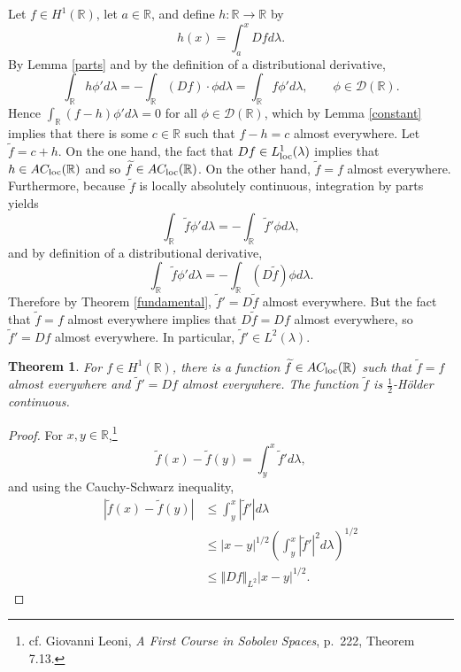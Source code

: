 \documentclass{article}
\newcommand{\Lloc}{L_{\ensuremath\mathrm{loc}}^1(\lambda)}
\newcommand{\ACloc}{AC_{\ensuremath\mathrm{loc}}(\mathbb{R})}
\newcommand{\norm}[1]{\left\Vert #1 \right\Vert}
\newtheorem{theorem}{Theorem}
\theoremstyle{definition}
\begin{document}
Let $f \in H^1(\mathbb{R})$, let $a \in \mathbb{R}$, and define $h:\mathbb{R} \to \mathbb{R}$ by
\[
h(x) = \int_a^x Df d\lambda.
\]
By Lemma \ref{parts} and by the definition of a distributional derivative,
\[
\int_\mathbb{R} h \phi' d\lambda = - \int_\mathbb{R} (Df) \cdot \phi d\lambda
=\int_\mathbb{R} f \phi' d\lambda,\qquad \phi \in \mathscr{D}(\mathbb{R}).
\]
Hence $\int_\mathbb{R} (f-h) \phi' d\lambda=0$ for all $\phi \in \mathscr{D}(\mathbb{R})$, which by Lemma
\ref{constant} implies that there is some $c \in \mathbb{R}$ such that
$f-h=c$ almost everywhere. Let $\widetilde{f}=c+h$. On the one hand,
the fact that $Df \in \Lloc$ implies that $h \in \ACloc$ and so
$\widetilde{f} \in \ACloc$. 
On the other hand, 
$\widetilde{f}=f$ almost everywhere. Furthermore, because $\widetilde{f}$ is locally absolutely continuous, integration
by parts yields 
\[
\int_\mathbb{R} \widetilde{f} \phi' d\lambda = -\int_\mathbb{R} \widetilde{f}' \phi d\lambda,
\]
and by definition of a distributional derivative,
\[
\int_\mathbb{R} \widetilde{f} \phi' d\lambda = - \int_\mathbb{R} (D \widetilde{f}) \phi d\lambda.
\]
Therefore by Theorem \ref{fundamental},  $\widetilde{f}'=D\widetilde{f}$ almost everywhere. But 
the fact that $\widetilde{f}=f$ almost everywhere implies that $D\widetilde{f}=Df$ almost everywhere, so
$\widetilde{f}'=Df$ almost everywhere. In particular, $\widetilde{f}' \in L^2(\lambda)$. 


\begin{theorem}
For $f \in H^1(\mathbb{R})$, there is a function $\widetilde{f} \in \ACloc$ such that $\widetilde{f}=f$ almost everywhere
 and $\widetilde{f}' = Df$ almost everywhere. The function $\widetilde{f}$ is $\frac{1}{2}$-H\"older continuous.
\end{theorem}
\begin{proof}
For $x,y \in \mathbb{R}$,\footnote{cf. Giovanni Leoni, {\em A First Course in Sobolev Spaces}, p.~222, Theorem 7.13.} 
\[
\widetilde{f}(x)-\widetilde{f}(y) = \int_y^x \widetilde{f}' d\lambda,
\]
and  using the Cauchy-Schwarz inequality,
\begin{align*}
|\widetilde{f}(x)-\widetilde{f}(y)|&\leq \int_y^x |\widetilde{f}'| d\lambda\\
&\leq |x-y|^{1/2} \left( \int_y^x |\widetilde{f}'|^2 d\lambda \right)^{1/2}\\
&\leq \norm{Df}_{L^2} |x-y|^{1/2}.
\end{align*}
\end{proof}
\end{document}
